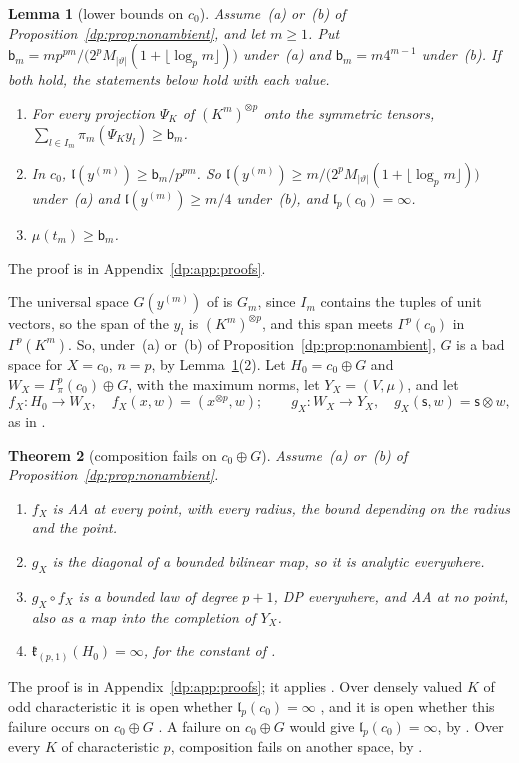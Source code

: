 \documentclass[11pt]{amsart}
\newtheorem{theorem}{Theorem}[section]
\newtheorem{lemma}[theorem]{Lemma}
\theoremstyle{definition}
\theoremstyle{remark}
\numberwithin{equation}{section}
\newcommand{\abs}[1]{\lvert #1\rvert}
\theoremstyle{plain}
\theoremstyle{definition}
\theoremstyle{plain}
\begin{document}
\begin{lemma}[lower bounds on $c_0$]\label{dp:lem:c0-lower}
Assume~\textup{(a)} or~\textup{(b)} of Proposition~\ref{dp:prop:nonambient}, and let $m\ge1$. Put $\mathsf b_m=mp^{pm}/\bigl(2^pM_{\abs\vartheta}(1+\lfloor\log_pm\rfloor)\bigr)$ under~\textup{(a)} and $\mathsf b_m=m4^{m-1}$ under~\textup{(b)}. If both hold, the statements below hold with each value.
\begin{enumerate}
\item For every projection $\Psi_K$ of $(K^m)^{\otimes p}$ onto the symmetric tensors, $\sum_{l\in I_m}\pi_m(\Psi_Ky_l)\ge\mathsf b_m$.
\item In $c_0$, $\mathfrak l(y^{(m)})\ge\mathsf b_m/p^{pm}$. So $\mathfrak l(y^{(m)})\ge m/\bigl(2^pM_{\abs\vartheta}(1+\lfloor\log_pm\rfloor)\bigr)$ under~\textup{(a)} and $\mathfrak l(y^{(m)})\ge m/4$ under~\textup{(b)}, and $\mathfrak l_p(c_0)=\infty$.
\item $\mu(t_m)\ge\mathsf b_m$.
\end{enumerate}
\end{lemma}
The proof is in Appendix~\ref{dp:app:proofs}.

The universal space $G(y^{(m)})$ of \cite[Definition~14.15]{I} is $G_m$, since $I_m$ contains the tuples of unit vectors, so the span of the $y_l$ is $(K^m)^{\otimes p}$, and this span meets $\Gamma^p(c_0)$ in $\Gamma^p(K^m)$. So, under~(a) or~(b) of Proposition~\ref{dp:prop:nonambient}, $G$ is a bad space for $X=c_0$, $n=p$, by Lemma~\ref{dp:lem:c0-lower}(2). Let $H_0=c_0\oplus G$ and $W_X=\Gamma^p_\pi(c_0)\oplus G$, with the maximum norms, let $Y_X=(V,\mu)$, and let
\[
 f_X\colon H_0\to W_X,\quad f_X(x,w)=(x^{\otimes p},w);\qquad
 g_X\colon W_X\to Y_X,\quad g_X(\mathsf s,w)=\mathsf s\otimes w,
\]
as in \cite[(14.5)]{I}.

\begin{theorem}[composition fails on $c_0\oplus G$]\label{dp:thm:c0-failure}
Assume~\textup{(a)} or~\textup{(b)} of Proposition~\ref{dp:prop:nonambient}.
\begin{enumerate}
\item $f_X$ is AA at every point, with every radius, the bound depending on the radius and the point.
\item $g_X$ is the diagonal of a bounded bilinear map, so it is analytic everywhere.
\item $g_X\circ f_X$ is a bounded law of degree $p+1$, DP everywhere, and AA at no point, also as a map into the completion of $Y_X$.
\item $\mathfrak k_{(p,1)}(H_0)=\infty$, for the constant of \cite[Definition~14.21]{I}.
\end{enumerate}
\end{theorem}
The proof is in Appendix~\ref{dp:app:proofs}; it applies \cite[Proposition~14.18]{I}. Over densely valued $K$ of odd characteristic it is open whether $\mathfrak l_p(c_0)=\infty$ \cite[Question~14.42(2)]{I}, and it is open whether this failure occurs on $c_0\oplus G$ \cite[Remark~14.20]{I}. A failure on $c_0\oplus G$ would give $\mathfrak l_p(c_0)=\infty$, by \cite[Theorem~14.24]{I}. Over every $K$ of characteristic $p$, composition fails on another space, by \cite[Theorem~14.17]{I}.
\end{document}
